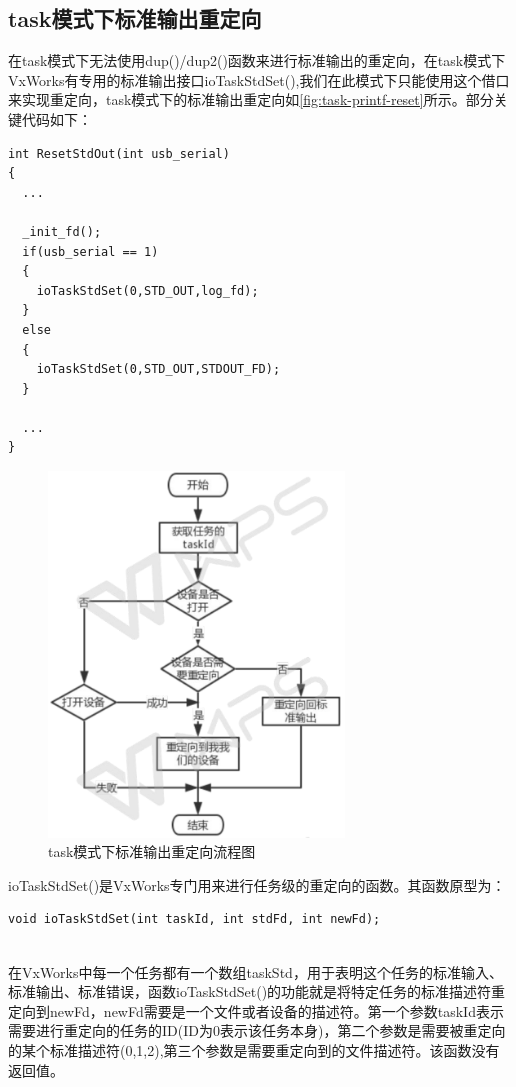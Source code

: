 \subsection{task模式下标准输出重定向}
在task模式下无法使用dup()/dup2()函数来进行标准输出的重定向，在task模式下VxWorks有专用的标准输出接口ioTaskStdSet(),我们在此模式下只能使用这个借口来实现重定向，task模式下的标准输出重定向如\autoref{fig:task-printf-reset}所示。部分关键代码如下：
\lstset{language=C}
\begin{lstlisting}
int ResetStdOut(int usb_serial)
{
  ...
	
  _init_fd();
  if(usb_serial == 1)
  {
    ioTaskStdSet(0,STD_OUT,log_fd);
  }
  else
  {
    ioTaskStdSet(0,STD_OUT,STDOUT_FD);
  }
  
  ...
}
\end{lstlisting}

\begin{figure}[!h]
\centering
\includegraphics[width=0.7\textwidth]{./graphics/TASK-STDOUT-RESET.pdf}
\caption{task模式下标准输出重定向流程图}\label{fig:task-printf-reset}
\end{figure}

ioTaskStdSet()是VxWorks专门用来进行任务级的重定向的函数。其函数原型为：
\lstset{language=C}
\begin{lstlisting}
void ioTaskStdSet(int taskId, int stdFd, int newFd);
\end{lstlisting}\\
在VxWorks中每一个任务都有一个数组taskStd，用于表明这个任务的标准输入、标准输出、标准错误，函数ioTaskStdSet()的功能就是将特定任务的标准描述符重定向到newFd，newFd需要是一个文件或者设备的描述符。第一个参数taskId表示需要进行重定向的任务的ID(ID为0表示该任务本身)，第二个参数是需要被重定向的某个标准描述符(0,1,2),第三个参数是需要重定向到的文件描述符。该函数没有返回值。


